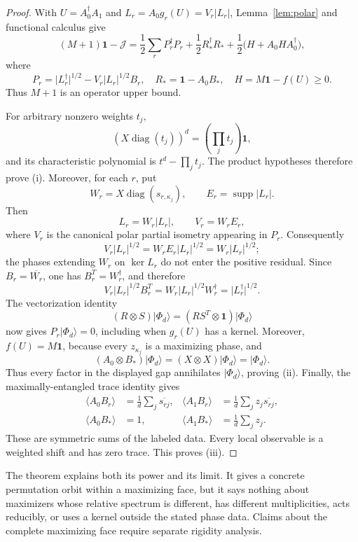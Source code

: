 \documentclass[11pt]{article}
\theoremstyle{definition}
\theoremstyle{remark}
\newcommand{\Id}{\mathbf 1}
\newcommand{\cJ}{\mathcal J}
\newcommand{\supp}{\operatorname{supp}}
\newcommand{\absop}[1]{\lvert #1\rvert}
\begin{document}
\begin{proof}
With \(U=A_0^\dagger A_1\) and
\(L_r=A_0g_r(U)=V_r\absop{L_r}\), Lemma~\ref{lem:polar} and functional
calculus give
\[
 (M+1)\Id-\cJ
 =\frac12\sum_rP_r^\dagger P_r
 +\frac12R_*^\dagger R_*
 +\frac12\bigl(H+A_0HA_0^\dagger\bigr),
\]
where
\[
 P_r=\absop{L_r^\dagger}^{1/2}-V_r\absop{L_r}^{1/2}B_r,
 \quad R_*=\Id-A_0B_*,
 \quad H=M\Id-f(U)\geq0.
\]
Thus \(M+1\) is an operator upper bound.

For arbitrary nonzero weights \(t_j\),
\begin{equation}
 \left(X\operatorname{diag}(t_j)\right)^d
 =\left(\prod_jt_j\right)\Id,
 \label{eq:weighted-cycle}
\end{equation}
and its characteristic polynomial is
\(t^d-\prod_jt_j\).  The product hypotheses therefore prove (i).  Moreover,
for each \(r\), put
\[
 W_r=X\operatorname{diag}(s_{r,\kappa_j}),
 \qquad
 E_r=\supp\absop{L_r}.
\]
Then
\[
 L_r=W_r\absop{L_r},
 \qquad
 V_r=W_rE_r,
\]
where \(V_r\) is the canonical polar partial isometry appearing in \(P_r\).
Consequently
\[
 V_r\absop{L_r}^{1/2}
 =W_rE_r\absop{L_r}^{1/2}
 =W_r\absop{L_r}^{1/2};
\]
the phases extending \(W_r\) on \(\ker L_r\) do not enter the positive
residual.  Since \(B_r=\overline{W_r}\), one has \(B_r^T=W_r^\dagger\), and
therefore
\[
 V_r\absop{L_r}^{1/2}B_r^T
 =W_r\absop{L_r}^{1/2}W_r^\dagger
 =\absop{L_r^\dagger}^{1/2}.
\]
The vectorization identity
\[
 (R\otimes S)\lvert\Phi_d\rangle
 =(RS^T\otimes\Id)\lvert\Phi_d\rangle
\]
now gives \(P_r\lvert\Phi_d\rangle=0\), including when \(g_r(U)\) has a
kernel.  Moreover, \(f(U)=M\Id\), because every \(z_{\kappa_j}\) is a
maximizing phase, and
\[
 (A_0\otimes B_*)\lvert\Phi_d\rangle
 =(X\otimes X)\lvert\Phi_d\rangle
 =\lvert\Phi_d\rangle.
\]
Thus every factor in the displayed gap annihilates
\(\lvert\Phi_d\rangle\), proving (ii).  Finally, the maximally-entangled
trace identity gives
\[
\begin{aligned}
 \langle A_0B_r\rangle&=\frac1d\sum_j\overline{s_{rj}},&
 \langle A_1B_r\rangle&=\frac1d\sum_jz_j\overline{s_{rj}},\\
 \langle A_0B_*\rangle&=1,&
 \langle A_1B_*\rangle&=\frac1d\sum_jz_j.
\end{aligned}
\]
These are symmetric sums of the labeled data.  Every local observable is a
weighted shift and has zero trace.  This proves (iii).
\end{proof}

The theorem explains both its power and its limit.  It gives a concrete
permutation orbit within a maximizing face, but it says nothing about
maximizers whose relative spectrum is different, has different
multiplicities, acts reducibly, or uses a kernel outside the stated phase
data.  Claims about the complete maximizing face require separate rigidity
analysis.
\end{document}
